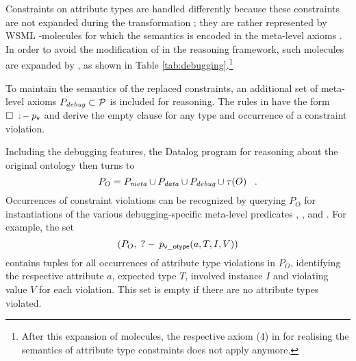 Constraints on attribute types are handled differently because
these constraints are not expanded during the transformation
\transax ; they are rather represented by WSML
-molecules for which the semantics is encoded in the
meta-level axioms \mlaxioms. In order to avoid the modification of
\mlaxioms in the reasoning framework, such molecules are expanded
by \transdebug, as shown in Table
\ref{tab:debugging}.\footnote{After this expansion of
 molecules, the respective axiom (4) in \mlaxioms for
realising the semantics of attribute type constraints does not
apply anymore.}

\medskip

To maintain the semantics of the replaced constraints, an
additional set of meta-level axioms $P_{\textit{\scriptsize{debug}}} \subset
\mathcal{P}$ is included for reasoning. The rules in \debugaxioms
have the form $\square\;:\!-\: p_{\mathrm{\sf v}}$ and derive
the empty clause for any type and occurrence of a constraint
violation.

Including the debugging features, the Datalog program for
reasoning about the original ontology then turns to \compress
\begin{displaymath}
    P_O = \mlaxioms \cup \dataaxioms \cup \debugaxioms \cup \tau(O)
    \;\;\;. \compress
\end{displaymath}
Occurrences of constraint violations can be recognized by querying
$P_O$ for instantiations of the various debugging-specific
meta-level predicates \pvotype, \pvmincard, \pvmaxcard and
\pvuser. For example, the set \compress
\begin{displaymath}
    (P_O , \qury \pvotype(a,T,I,V)) \compress
\end{displaymath}
contains tuples for all occurrences of attribute type violations
in $P_O$, identifying the respective attribute $a$, expected type
$T$, involved instance $I$ and violating value $V$ for each
violation. This set is empty if there are no attribute types
violated.

